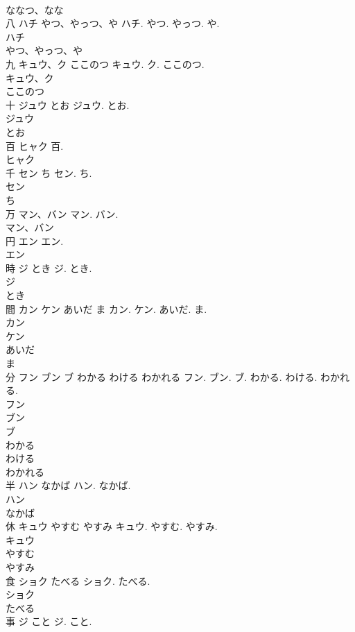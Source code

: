 \documentclass[8pt]{extreport}
\begin{document}
\begin{CJK}{UTF8}{min}
\\	ななつ、なな
\\	八	ハチ やつ、やっつ、や	ハチ. やつ. やっつ. や.	
\\	ハチ
\\	やつ、やっつ、や
\\	九	キュウ、ク ここのつ	キュウ. ク. ここのつ.	
\\	キュウ、ク
\\	ここのつ
\\	十	ジュウ とお	ジュウ. とお.	
\\	ジュウ
\\	とお
\\	百	ヒャク	百.	
\\	ヒャク
\\	千	セン ち	セン. ち.	
\\	セン
\\	ち
\\	万	マン、バン	マン. バン.	
\\	マン、バン
\\	円	エン	エン.	
\\	エン
\\	時	ジ とき	ジ. とき.	
\\	ジ
\\	とき
\\	間	カン ケン あいだ ま	カン. ケン. あいだ. ま.	
\\	カン
\\	ケン
\\	あいだ
\\	ま
\\	分	フン ブン ブ わかる わける わかれる	フン. ブン. ブ. わかる. わける. わかれる.	
\\	フン
\\	ブン
\\	ブ
\\	わかる
\\	わける
\\	わかれる
\\	半	ハン なかば	ハン. なかば.	
\\	ハン
\\	なかば
\\	休	キュウ やすむ やすみ	キュウ. やすむ. やすみ.	
\\	キュウ
\\	やすむ
\\	やすみ
\\	食	ショク たべる	ショク. たべる.	
\\	ショク
\\	たべる
\\	事	ジ こと	ジ. こと.	

\end{CJK}
\end{document}

